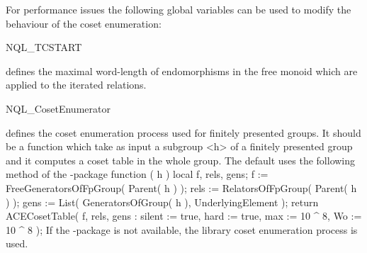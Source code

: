 
For performance issues the following global variables can be used to modify
the behaviour of the coset enumeration:

\> NQL_TCSTART

defines the maximal word-length of endomorphisms in the free monoid which are
applied to the iterated relations.

\> NQL_CosetEnumerator

defines the coset enumeration process used for finitely presented groups.
It should be a function which take as input a subgroup <h> of a finitely
presented group and it computes a coset table in the whole group.
The default uses the following method of the \ACE-package
\beginexample
function ( h )
    local  f, rels, gens;
    f := FreeGeneratorsOfFpGroup( Parent( h ) );
    rels := RelatorsOfFpGroup( Parent( h ) );
    gens := List( GeneratorsOfGroup( h ), UnderlyingElement );
    return ACECosetTable( f, rels, gens : silent := true,
        hard := true,
        max := 10 ^ 8,
        Wo := 10 ^ 8 );
\endexample
If the \ACE-package is not available, the library coset enumeration process
is used.

